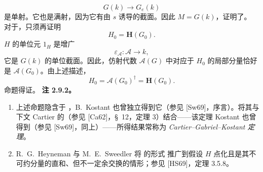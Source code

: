 \[
  G(k)\longrightarrow G_e(k)
\]
是单射。它也是满射，因为它有由 \(s\) 诱导的截面。因此 \(M=G(k)\)，证明了\textup{}。
对于\textup{}，只须再证明
\[
  H_0=\mathbf H(G_0).
\]
\(H\) 的单位元 \(1_H\) 是增广
\[
  \varepsilon_{\mathcal A}:\mathcal A\longrightarrow k,
\]
它是 \(G(k)\) 的单位截面。因此，仿射代数 \(\mathcal A(G)\) 中对应于 \(H_0\) 的局部分量恰好是 \(\mathcal A(G_0)\)。由上述描述，
\[
  H_0
  =
  \mathcal A(G_0)^\dagger
  =
  \mathbf H(G_0).
\]
命题得证。
\medskip
\noindent\textbf{注 2.9.2。}
\label{sga3:VIIB:2.9.2}
\begin{enumerate}
\item[\textup{(a)}]
上述命题隐含于 ，B.\ Kostant 也曾独立得到它\textup{（参见 [Sw69]，序言）}。将其与下文 Cartier 的\textup{（参见 [Ca62]，\S~12，定理 3）}结合——该定理 Kostant 也曾得到\textup{（参见 [Sw69]，同上）}——所得结果常称为 \emph{Cartier--Gabriel--Kostant 定理}。
\item[\textup{(b)}]
R.\ G.\ Heyneman 与 M.\ E.\ Sweedler 将 的形式\textup{} 推广到假设 \(H\) 点化且是其不可约分量的直和、但不一定余交换的情形；参见 [HS69]，定理 3.5.8。
\end{enumerate}
